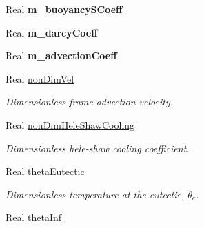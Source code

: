\begin{DoxyCompactItemize}
\item 
\hypertarget{class_mushy_layer_params_aaa23101aa42c18cf486657a7f67ba849}{Real {\bfseries m\-\_\-buoyancy\-S\-Coeff}}\label{class_mushy_layer_params_aaa23101aa42c18cf486657a7f67ba849}

\item 
\hypertarget{class_mushy_layer_params_aaebe5958b0fba7ee680fd50ce2cddcc5}{Real {\bfseries m\-\_\-darcy\-Coeff}}\label{class_mushy_layer_params_aaebe5958b0fba7ee680fd50ce2cddcc5}

\item 
\hypertarget{class_mushy_layer_params_ab92ff3374f9423afb3757c46e6ca4ea2}{Real {\bfseries m\-\_\-advection\-Coeff}}\label{class_mushy_layer_params_ab92ff3374f9423afb3757c46e6ca4ea2}

\item 
\hypertarget{class_mushy_layer_params_ad39ae54e74b73aa8ec86df8186b6fa6d}{Real \hyperlink{class_mushy_layer_params_ad39ae54e74b73aa8ec86df8186b6fa6d}{non\-Dim\-Vel}}\label{class_mushy_layer_params_ad39ae54e74b73aa8ec86df8186b6fa6d}

\begin{DoxyCompactList}\small\item\em Dimensionless frame advection velocity. \end{DoxyCompactList}\item 
\hypertarget{class_mushy_layer_params_aa62c3b14e58be4912cacb2120068960a}{Real \hyperlink{class_mushy_layer_params_aa62c3b14e58be4912cacb2120068960a}{non\-Dim\-Hele\-Shaw\-Cooling}}\label{class_mushy_layer_params_aa62c3b14e58be4912cacb2120068960a}

\begin{DoxyCompactList}\small\item\em Dimensionless hele-\/shaw cooling coefficient. \end{DoxyCompactList}\item 
\hypertarget{class_mushy_layer_params_a45829b6d494fc913f1680e2352596c38}{Real \hyperlink{class_mushy_layer_params_a45829b6d494fc913f1680e2352596c38}{theta\-Eutectic}}\label{class_mushy_layer_params_a45829b6d494fc913f1680e2352596c38}

\begin{DoxyCompactList}\small\item\em Dimensionless temperature at the eutectic, $ \theta_e $. \end{DoxyCompactList}\item 
\hypertarget{class_mushy_layer_params_a5fbe1ecc5dec8ea3d40f2f790207245c}{Real \hyperlink{class_mushy_layer_params_a5fbe1ecc5dec8ea3d40f2f790207245c}{theta\-Inf}}\label{class_mushy_layer_params_a5fbe1ecc5dec8ea3d40f2f790207245c}


\end{DoxyCompactItemize}
